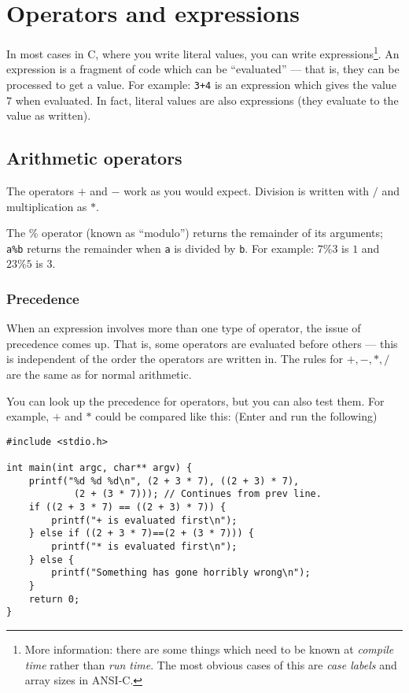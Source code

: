 
\chapter{Operators and expressions}


In most cases in C, where you write literal values, you can write expressions\footnote{More information:
there are some things which need to be known at \emph{compile time} rather than \emph{run time}.
The most obvious cases of this are \emph{case labels} and array sizes in ANSI-C.}.
An expression is a fragment of code which can be ``evaluated'' --- that is, they can be processed to get a value.
For example:
\texttt{3+4} is an expression which gives the value $7$ when evaluated.
In fact, literal values are also expressions (they evaluate to the value as written).

\section{Arithmetic operators}

The operators $+$ and $-$ work as you would expect.
Division is written with $/$ and multiplication as $*$.

The \% operator (known as ``modulo'') returns the remainder of its arguments;
\texttt{a\%b} returns the remainder when \texttt{a} is divided by \texttt{b}.
For example: $7\%3$ is $1$   and $23\%5$ is $3$.


\subsection{Precedence}
When an expression involves more than one type of operator, the issue of precedence comes up.
That is, some operators are evaluated before others --- this is independent of the order the operators are written in.
The rules for $+,-,*,/$ are the same as for normal arithmetic.

You can look up the precedence for operators, but you can also test them.
For example, $+$ and $*$ could be compared like this:
(Enter and run the following)
\begin{lstlisting}
#include <stdio.h>

int main(int argc, char** argv) {
    printf("%d %d %d\n", (2 + 3 * 7), ((2 + 3) * 7),
            (2 + (3 * 7))); // Continues from prev line.
    if ((2 + 3 * 7) == ((2 + 3) * 7)) {
        printf("+ is evaluated first\n");    
    } else if ((2 + 3 * 7)==(2 + (3 * 7))) {
        printf("* is evaluated first\n");
    } else {
        printf("Something has gone horribly wrong\n");
    }
    return 0;
}
\end{lstlisting} 

